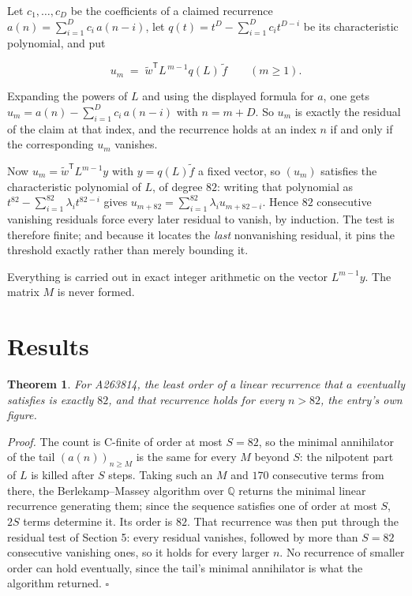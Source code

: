 \documentclass[11pt]{article}
\newtheorem{theorem}{Theorem}
\theoremstyle{definition}
\begin{document}
Let $c_1,\dots,c_D$ be the coefficients of a claimed recurrence $a(n) = \sum_{i=1}^{D} c_i\,a(n-i)$, let $q(t) = t^{D} - \sum_{i=1}^{D} c_i t^{D-i}$ be its characteristic polynomial, and put

\[u_m \;=\; \tilde w^{\mathsf T} L^{\,m-1} q(L)\,\tilde f \qquad (m \ge 1).\]

Expanding the powers of $L$ and using the displayed formula for $a$, one gets $u_m = a(n) - \sum_{i=1}^{D} c_i\,a(n-i)$ with $n = m + D$. So $u_m$ is exactly the residual of the claim at that index, and the recurrence holds at an index $n$ if and only if the corresponding $u_m$ vanishes.

Now $u_m = \tilde w^{\mathsf T} L^{m-1} y$ with $y = q(L)\tilde f$ a fixed vector, so $(u_m)$ satisfies the characteristic polynomial of $L$, of degree $82$: writing that polynomial as $t^{82} - \sum_{i=1}^{82} \lambda_i t^{82-i}$ gives $u_{m+82} = \sum_{i=1}^{82} \lambda_i u_{m+82-i}$. Hence $82$ consecutive vanishing residuals force every later residual to vanish, by induction. The test is therefore finite; and because it locates the {\itshape last} nonvanishing residual, it pins the threshold exactly rather than merely bounding it.

Everything is carried out in exact integer arithmetic on the vector $L^{m-1}y$. The matrix $M$ is never formed.

\section{Results}

\begin{theorem} For A263814, the least order of a linear recurrence that $a$ eventually satisfies is exactly $82$, and that recurrence holds for every $n > 82$, the entry's own figure.\end{theorem}

{\itshape Proof.} The count is C-finite of order at most $S = 82$, so the minimal annihilator of the tail $(a(n))_{n \ge M}$ is the same for every $M$ beyond $S$: the nilpotent part of $L$ is killed after $S$ steps. Taking such an $M$ and $170$ consecutive terms from there, the Berlekamp--Massey algorithm over $\mathbb{Q}$ returns the minimal linear recurrence generating them; since the sequence satisfies one of order at most $S$, $2S$ terms determine it. Its order is $82$. That recurrence was then put through the residual test of Section 5: every residual vanishes, followed by more than $S = 82$ consecutive vanishing ones, so it holds for every larger $n$. No recurrence of smaller order can hold eventually, since the tail's minimal annihilator is what the algorithm returned. $\square$
\end{document}
